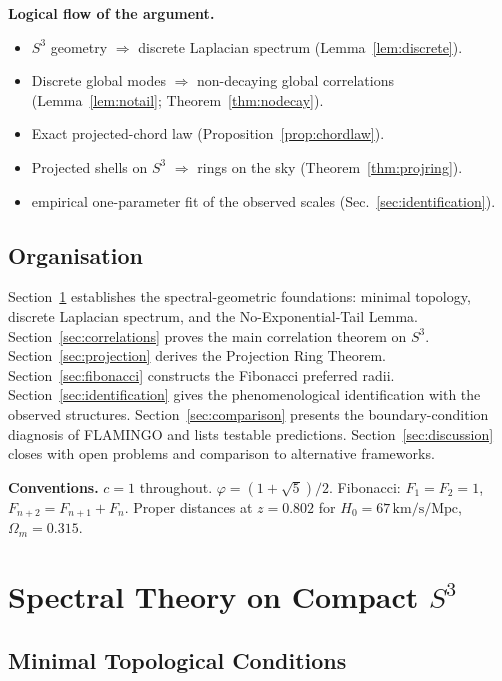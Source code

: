 \documentclass[
  aps,
  prd,
  reprint,
  superscriptaddress,
  nofootinbib,
  longbibliography,
  floatfix,
  amsmath,
  amssymb
]{revtex4-2}
\theoremstyle{plain}
\theoremstyle{definition}
\theoremstyle{remark}
\newcommand{\vp}{\varphi}
\newcommand{\Sthree}{S^3}
\begin{document}
\textbf{Logical flow of the argument.}
\begin{itemize}[leftmargin=*,noitemsep]
  \item $\Sthree$ geometry $\Rightarrow$ discrete Laplacian spectrum
    (Lemma~\ref{lem:discrete}).
  \item Discrete global modes $\Rightarrow$ non-decaying global
    correlations (Lemma~\ref{lem:notail};
    Theorem~\ref{thm:nodecay}).
  \item Exact projected-chord law (Proposition~\ref{prop:chordlaw}).
  \item Projected shells on $\Sthree$ $\Rightarrow$ rings on the sky
    (Theorem~\ref{thm:projring}).
  \item empirical one-parameter fit of the observed scales (Sec.~\ref{sec:identification}).
\end{itemize}

\subsection{Organisation}

Section~\ref{sec:spectral} establishes the spectral-geometric
foundations: minimal topology, discrete Laplacian spectrum, and the
No-Exponential-Tail Lemma. Section~\ref{sec:correlations} proves the
main correlation theorem on $\Sthree$. Section~\ref{sec:projection}
derives the Projection Ring Theorem. Section~\ref{sec:fibonacci}
constructs the Fibonacci preferred radii.
Section~\ref{sec:identification} gives the phenomenological
identification with the observed structures. Section~\ref{sec:comparison}
presents the boundary-condition diagnosis of FLAMINGO and lists
testable predictions. Section~\ref{sec:discussion} closes with
open problems and comparison to alternative frameworks.

\medskip\noindent
\textbf{Conventions.} $c=1$ throughout. $\vp=(1+\sqrt5)/2$.
Fibonacci: $F_1=F_2=1$, $F_{n+2}=F_{n+1}+F_n$. Proper distances at
$z=0.802$ for $H_0=67\,\mathrm{km/s/Mpc}$, $\Omega_m=0.315$.

\section{Spectral Theory on Compact $S^3$}
\label{sec:spectral}

\subsection{Minimal Topological Conditions}
\end{document}

